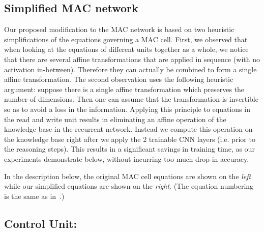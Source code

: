 \subsection{Simplified MAC network}
Our proposed modification to the MAC network is based on two heuristic
simplifications of the equations governing a MAC cell. 
First, we observed that when looking at the equations of different units
together as a whole, we notice that there are several affine transformations
that are applied in sequence (with no activation in-between).
Therefore they can actually be combined to form a single affine transformation.
The second observation uses the following heuristic argument:
suppose there is a single affine transformation which preserves the number
of dimensions. Then one can assume that the transformation is invertible
so as to avoid a loss in the information. Applying this principle to 
equations in the read and write unit results in eliminating an affine
operation of the knowledge base in the recurrent network. Instead we compute
this operation on the knowledge base right after we apply the 2 
trainable CNN layers (i.e. prior to the reasoning steps). This results
in a significant savings in training time, as our experiments demonstrate
below, without incurring too much drop in accuracy.

In the description below, the original MAC cell equations are shown on the \emph{left}
while our simplified equations are shown on the \emph{right}.
(The equation numbering is the same as in~\cite{hudsonManning18}.)

\setlength{\columnsep}{1cm}
\setlength{\columnseprule}{0.5pt}


\subsection*{Control Unit:}
\newcommand{\cq}{cq}
\newcommand{\ca}{ca}
\newcommand{\cw}{\mathbf{cw}}
\newcommand{\cc}{\mathbf{c}}

